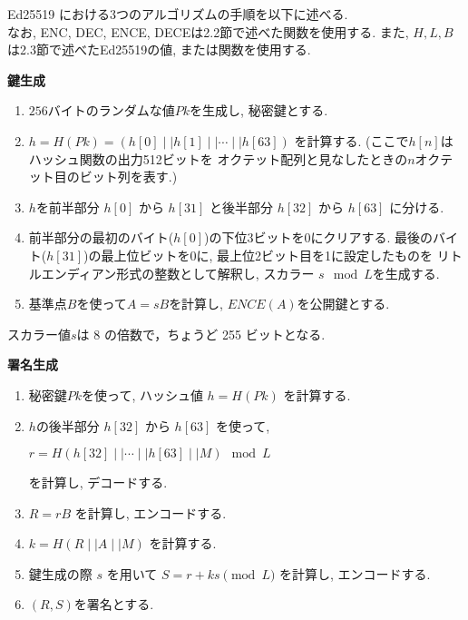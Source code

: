 Ed25519 における3つのアルゴリズムの手順を以下に述べる.\\
\indent なお, ENC, DEC, ENCE, DECEは2.2節で述べた関数を使用する.
また, $H, L, B$は2.3節で述べたEd25519の値, または関数を使用する.\\[1em]
\let\ltxlist\list
\begin{breakitembox}[l]{\textbf{鍵生成}}
  　
  \begin{enumerate}[parsep=7pt]
    \item $256$バイトのランダムな値$Pk$を生成し, 秘密鍵とする.
    \item $h=H(Pk)=(h[0]\mid\mid h[1]\mid\mid \cdots\mid\mid h[63])$
    を計算する. (ここで$h[n]$はハッシュ関数の出力512ビットを
    オクテット配列と見なしたときの$n$オクテット目のビット列を表す.)
    \item $h$を前半部分 $h[0]$ から $h[31]$ と後半部分 $h[32]$ から $h[63]$ に分ける.
    \item 前半部分の最初のバイト($h[0]$)の下位3ビットを0にクリアする.
    最後のバイト($h[31]$)の最上位ビットを0に, 最上位2ビット目を1に設定したものを
    リトルエンディアン形式の整数として解釈し, スカラー $s \mod L$を生成する.
    \item 基準点$B$を使って$A = sB$を計算し, $ENCE(A)$を公開鍵とする.
  \end{enumerate}
  スカラー値$s$は 8 の倍数で，ちょうど 255 ビットとなる.
\end{breakitembox}
\vspace{2em}
\let\ltxlist\list
\begin{breakitembox}[l]{\textbf{署名生成}}
  　
  \begin{enumerate}[parsep=7pt]
    \item 秘密鍵$Pk$を使って, ハッシュ値 $h=H(Pk)$ を計算する.
    \item $h$の後半部分 $h[32]$ から $h[63]$ を使って, 
    \begin{center}
      $r = H(h[32]\mid\mid \cdots \mid\mid h[63] \mid\mid M) \mod L$
    \end{center}
    を計算し, デコードする.
    \item $R=rB$ を計算し, エンコードする.
    \item $k=H(R \mid\mid A \mid\mid M)$ を計算する.
    \item 鍵生成の際 $s$ を用いて $S=r+ks \pmod L$ を計算し, エンコードする.
    \item $(R,S)$を署名とする.
  \end{enumerate}
\end{breakitembox}
\vspace{2em}
